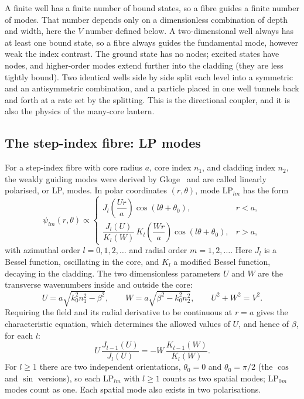 \documentclass[11pt,a4paper]{article}
\begin{document}
A finite well has a finite number of bound states, so a fibre guides a finite number of modes. That number depends only on a dimensionless combination of depth and width, here the $V$ number defined below. A two-dimensional well always has at least one bound state, so a fibre always guides the fundamental mode, however weak the index contrast. The ground state has no nodes; excited states have nodes, and higher-order modes extend further into the cladding (they are less tightly bound). Two identical wells side by side split each level into a symmetric and an antisymmetric combination, and a particle placed in one well tunnels back and forth at a rate set by the splitting. This is the directional coupler, and it is also the physics of the many-core lantern.

\subsection{The step-index fibre: LP modes}
For a step-index fibre with core radius $a$, core index $n_1$, and cladding index $n_2$, the weakly guiding modes were derived by Gloge~\cite{Gloge1971} and are called linearly polarised, or LP, modes. In polar coordinates $(r,\theta)$, mode $\mathrm{LP}_{lm}$ has the form
\begin{equation}
\psi_{lm}(r,\theta) \propto
\begin{cases}
J_l\!\left(\dfrac{U r}{a}\right) \cos(l\theta + \theta_0), & r < a, \\[6pt]
\dfrac{J_l(U)}{K_l(W)}\, K_l\!\left(\dfrac{W r}{a}\right) \cos(l\theta + \theta_0), & r > a,
\end{cases}
\label{eq:lpmode}
\end{equation}
with azimuthal order $l = 0, 1, 2, \ldots$ and radial order $m = 1, 2, \ldots$. Here $J_l$ is a Bessel function, oscillating in the core, and $K_l$ a modified Bessel function, decaying in the cladding. The two dimensionless parameters $U$ and $W$ are the transverse wavenumbers inside and outside the core:
\begin{equation}
U = a\sqrt{k_0^2 n_1^2 - \beta^2},
\qquad
W = a\sqrt{\beta^2 - k_0^2 n_2^2},
\qquad
U^2 + W^2 = V^2.
\label{eq:UW}
\end{equation}
Requiring the field and its radial derivative to be continuous at $r = a$ gives the characteristic equation, which determines the allowed values of $U$, and hence of $\beta$, for each $l$:
\begin{equation}
U\, \frac{J_{l-1}(U)}{J_l(U)} = -W\, \frac{K_{l-1}(W)}{K_l(W)}.
\label{eq:char}
\end{equation}
For $l \geq 1$ there are two independent orientations, $\theta_0 = 0$ and $\theta_0 = \pi/2$ (the $\cos$ and $\sin$ versions), so each $\mathrm{LP}_{lm}$ with $l \geq 1$ counts as two spatial modes; $\mathrm{LP}_{0m}$ modes count as one. Each spatial mode also exists in two polarisations.
\end{document}

